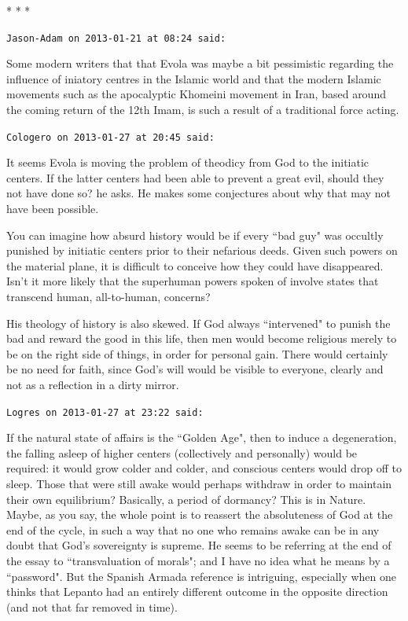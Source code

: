 \begin{center}* * *\end{center}

\begin{footnotesize}\begin{sffamily}



\texttt{Jason-Adam on 2013-01-21 at 08:24 said: }

Some modern writers that that Evola was maybe a bit pessimistic regarding the influence of iniatory centres in the Islamic world and that the modern Islamic movements such as the apocalyptic Khomeini movement in Iran, based around the coming return of the 12th Imam, is such a result of a traditional force acting.


\hfill

\texttt{Cologero on 2013-01-27 at 20:45 said: }

It seems Evola is moving the problem of theodicy from God to the initiatic centers. If the latter centers had been able to prevent a great evil, should they not have done so? he asks. He makes some conjectures about why that may not have been possible.

You can imagine how absurd history would be if every ``bad guy" was occultly punished by initiatic centers prior to their nefarious deeds. Given such powers on the material plane, it is difficult to conceive how they could have disappeared. Isn't it more likely that the superhuman powers spoken of involve states that transcend human, all-to-human, concerns?

His theology of history is also skewed. If God always ``intervened" to punish the bad and reward the good in this life, then men would become religious merely to be on the right side of things, in order for personal gain. There would certainly be no need for faith, since God's will would be visible to everyone, clearly and not as a reflection in a dirty mirror.


\hfill

\texttt{Logres on 2013-01-27 at 23:22 said: }

If the natural state of affairs is the ``Golden Age", then to induce a degeneration, the falling asleep of higher centers (collectively and personally) would be required: it would grow colder and colder, and conscious centers would drop off to sleep. Those that were still awake would perhaps withdraw in order to maintain their own equilibrium? Basically, a period of dormancy? This is in Nature. Maybe, as you say, the whole point is to reassert the absoluteness of God at the end of the cycle, in such a way that no one who remains awake can be in any doubt that God's sovereignty is supreme. He seems to be referring at the end of the essay to ``transvaluation of morals"; and I have no idea what he means by a ``password". But the Spanish Armada reference is intriguing, especially when one thinks that Lepanto had an entirely different outcome in the opposite direction (and not that far removed in time).



\end{sffamily}
\end{footnotesize}
